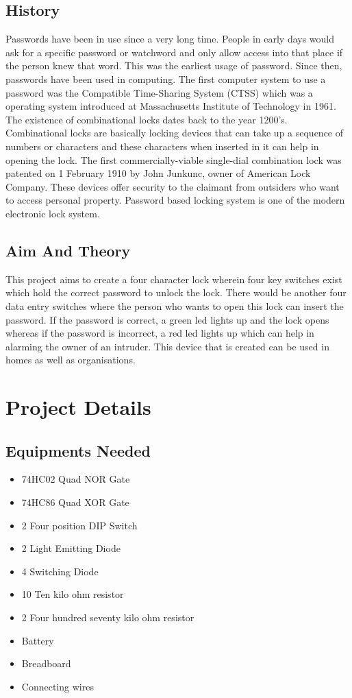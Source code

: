 \documentclass{article}
\begin{document}
\subsection{History}
Passwords have been in use since a very long time. People in early days would ask for a specific password or watchword and only allow access into that place if the person knew that word. This was the earliest usage of password. Since then, passwords have been used in computing. The first computer system to use a password was the Compatible Time-Sharing System (CTSS) which was a operating system introduced at Massachusetts Institute of Technology in 1961. The existence of combinational locks dates back to the year 1200's. Combinational locks are basically locking devices that can take up a sequence of numbers or characters and these characters when inserted in it can help in opening the lock. The first commercially-viable single-dial combination lock was patented on 1 February 1910 by John Junkunc, owner of American Lock Company. These devices offer security to the claimant from outsiders who want to access personal property. Password based locking system is one of the modern electronic lock system.
\subsection {Aim And Theory}
This project aims to create a four character lock wherein four key switches exist which hold the correct password to unlock the lock. There would be another four data entry switches where the person who wants to open this lock can insert the password. If the password is correct, a green led lights up and the lock opens whereas if the password is incorrect, a red led lights up which can help in alarming the owner of an intruder. This device that is created can be used in homes as well as organisations.
\newpage
\section{Project Details}
\subsection{Equipments Needed}
\begin{itemize}
\item 74HC02 Quad NOR Gate
\item 74HC86 Quad XOR Gate
\item 2 Four position DIP Switch
\item 2 Light Emitting Diode
\item 4 Switching Diode
\item 10 Ten kilo ohm resistor 
\item 2 Four hundred seventy kilo ohm resistor
\item Battery
\item Breadboard
\item Connecting wires 
\end{itemize}
\end{document}
